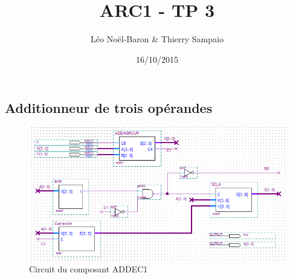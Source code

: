 \documentclass[a4paper,11pt]{article}
\title{ARC1 - TP 3}
\author{Léo Noël-Baron \& Thierry Sampaio}
\date{16/10/2015}
\begin{document}
\maketitle

\subsection*{Additionneur de trois opérandes}

\begin{figure}[h]
\center
\includegraphics[scale=0.8]{Addec1.PNG}
\caption{Circuit du composant ADDEC1}
\label{final}
\end{figure}
\end{document}

